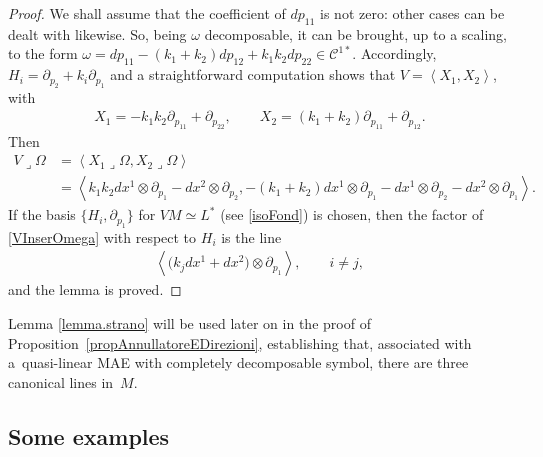 \documentclass[pdftex]{sigma}
\newcommand{\C}{\mathcal{C}}
\newcommand{\Span}[1]{\left\langle #1 \right\rangle}
\newcommand{\elle}{H}
\numberwithin{equation}{section}
\begin{document}
\begin{proof}
We shall assume that the coef\/f\/icient of $dp_{11}$ is not zero: other cases can be dealt with likewise. So, being $\omega$ decomposable, it can be brought, up to a scaling, to the form
$\omega=dp_{11}-(k_1+k_2)dp_{12}+k_1k_2dp_{22}\in\C^{1\ast}$.
Accordingly,
$\elle_i=\partial_{p_2}+k_i\partial_{p_1}$
and a straightforward computation shows that
$V=\Span{X_1,X_2}$,
with
\begin{gather}
X_1=-k_1k_2\partial_{p_{11}}+\partial_{p_{22}},\qquad X_2=(k_1+k_2)\partial_{p_{11}}+\partial_{p_{12}}.\label{eqX1X2}
\end{gather}
Then
\begin{align}
V\lrcorner \Omega &=\Span{X_1\lrcorner \Omega,X_2\lrcorner \Omega} \nonumber \\
 &
 =\Span{k_1k_2 dx^1\otimes \partial_{p_1}-dx^2\otimes \partial_{p_2}, -(k_1+k_2)dx^1\otimes \partial_{p_1}-dx^1\otimes \partial_{p_2}-dx^2\otimes \partial_{p_1}} .\label{VInserOmega}
\end{align}
If the basis $\{\elle_i,\partial_{p_1}\}$ for $VM\simeq L^\ast$ (see \eqref{isoFond}) is chosen, then the factor of \eqref{VInserOmega} with respect to $\elle_i$ is the line
\begin{gather}\label{eqLineaFinale}
\Span{\big(k_jdx^1+dx^2\big)\otimes\partial_{p_1}},\qquad i\neq j,
\end{gather}
and the lemma is proved.
\end{proof}

Lemma \ref{lemma.strano} will be used later on in the proof of Proposition~\ref{propAnnullatoreEDirezioni}, establishing that,
associated with a~quasi-linear MAE with completely decomposable symbol, there are three canonical lines in~$M$.

\subsection{Some examples}\label{exEqQL}
\end{document}
